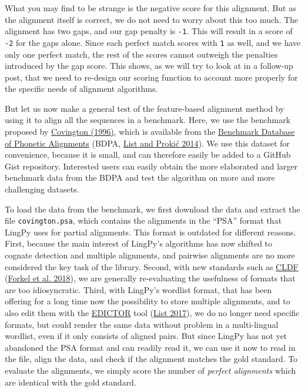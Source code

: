 \documentclass[
  a4paper,
  14pt,
  oneside,
  tablecaptionabove
]{scrbook}
\newcommand{\passthrough}[1]{#1}
\begin{document}
What you may find to be strange is the negative score for this
alignment. But as the alignment itself is correct, we do not need to
worry about this too much. The alignment has two gaps, and our gap
penalty is \passthrough{\lstinline!-1!}. This will result in a score of
\passthrough{\lstinline!-2!} for the gaps alone. Since each perfect
match scores with \passthrough{\lstinline!1!} as well, and we have only
one perfect match, the rest of the scores cannot outweigh the penalties
introduced by the gap score. This shows, as we will try to look at in a
follow-up post, that we need to re-design our scoring function to
account more properly for the specific needs of alignment algorithms.

But let us now make a general test of the feature-based alignment method
by using it to align all the sequences in a benchmark. Here, we use the
benchmark proposed by
\href{http://bibliography.lingpy.org?key=Covington1996}{Covington
(1996)}, which is available from the
\href{http://alignments.lingpy.org}{Benchmark Database of Phonetic
Alignments} (BDPA,
\href{http://bibliography.lingpy.org?key=List2014e}{List and Prokić
2014}). We use this dataset for convenience, because it is small, and
can therefore easily be added to a GitHub Gist repository. Interested
users can easily obtain the more elaborated and larger benchmark data
from the BDPA and test the algorithm on more and more challenging
datasets.

To load the data from the benchmark, we first download the data and
extract the file \passthrough{\lstinline!covington.psa!}, which
contains the alignments in the \enquote{PSA} format that LingPy uses for
partial alignments. This format is outdated for different reasons.
First, because the main interest of LingPy's algorithms has now shifted
to cognate detection and multiple alignments, and pairwise alignments
are no more considered the key task of the library. Second, with new
standards such as \href{https://cldf.clld.org}{CLDF} (\href{http://bibliography.lingpy.org?key=Forkel2018a}{Forkel et al.
2018}), we are generally re-evaluating the usefulness of formats that
are too idiosyncratic. Third, with LingPy's wordlist format, that has
been offering for a long time now the possibility to store multiple
alignments, and to also edit them with the
\href{http://edictor.digling.org}{EDICTOR} tool (\href{http://bibliography.lingpy.org?key=List2017d}{List 2017}), we do
no longer need specific formats, but could render the same data without
problem in a multi-lingual wordlist, even if it only consists of aligned
pairs.
But since LingPy has not yet abandoned the PSA format and can readily
read it, we can use it now to read in the file, align the data, and
check if the alignment matches the gold standard. To evaluate the
alignments, we simply score the number of \emph{perfect alignments}
which are identical with the gold standard.
\end{document}
